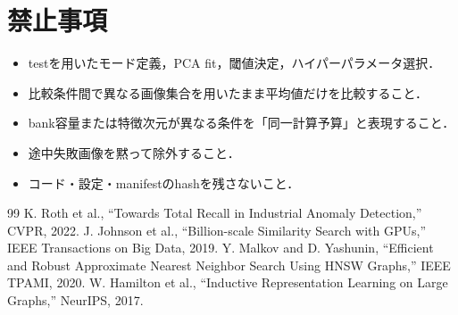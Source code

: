 \documentclass[a4paper,11pt]{ltjsarticle}
\begin{document}
\section{禁止事項}
\begin{itemize}
  \item testを用いたモード定義，PCA fit，閾値決定，ハイパーパラメータ選択．
  \item 比較条件間で異なる画像集合を用いたまま平均値だけを比較すること．
  \item bank容量または特徴次元が異なる条件を「同一計算予算」と表現すること．
  \item 途中失敗画像を黙って除外すること．
  \item コード・設定・manifestのhashを残さないこと．
\end{itemize}

\begin{thebibliography}{99}
 K. Roth et al., ``Towards Total Recall in Industrial Anomaly Detection,'' CVPR, 2022.
 J. Johnson et al., ``Billion-scale Similarity Search with GPUs,'' IEEE Transactions on Big Data, 2019.
 Y. Malkov and D. Yashunin, ``Efficient and Robust Approximate Nearest Neighbor Search Using HNSW Graphs,'' IEEE TPAMI, 2020.
 W. Hamilton et al., ``Inductive Representation Learning on Large Graphs,'' NeurIPS, 2017.
\end{thebibliography}
\end{document}
